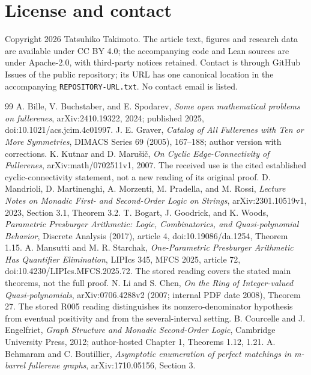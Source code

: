 \documentclass[11pt]{amsart}
\newcommand{\record}[1]{\nolinkurl{#1}}
\theoremstyle{definition}\newtheorem{definition}{Definition}
\begin{document}
\section*{License and contact}
Copyright 2026 Tatsuhiko Takimoto. The article text, figures and research
data are available under CC BY 4.0; the accompanying code and Lean
sources are under Apache-2.0, with third-party notices retained.
Contact is through GitHub Issues of the public repository; its URL
has one canonical location in the accompanying
\record{REPOSITORY-URL.txt}. No contact email is listed.

\clearpage
\begin{thebibliography}{99}
 A. Bille, V. Buchstaber, and E. Spodarev,
\emph{Some open mathematical problems on fullerenes}, arXiv:2410.19322,
2024; published 2025, doi:10.1021/acs.jcim.4c01997.
 J. E. Graver,
\emph{Catalog of All Fullerenes with Ten or More Symmetries},
DIMACS Series 69 (2005), 167--188; author version with corrections.
 K. Kutnar and D. Maru\v{s}i\v{c},
\emph{On Cyclic Edge-Connectivity of Fullerenes}, arXiv:math/0702511v1,
2007. The received use is the cited established cyclic-connectivity
statement, not a new reading of its original proof.
 D. Mandrioli, D. Martinenghi, A. Morzenti,
M. Pradella, and M. Rossi,
\emph{Lecture Notes on Monadic First- and Second-Order Logic on Strings},
arXiv:2301.10519v1, 2023, Section 3.1, Theorem 3.2.
 T. Bogart, J. Goodrick, and K. Woods,
\emph{Parametric Presburger Arithmetic: Logic, Combinatorics, and
Quasi-polynomial Behavior}, Discrete Analysis (2017), article 4,
doi:10.19086/da.1254, Theorem 1.15.
 A. Mansutti and M. R. Starchak,
\emph{One-Parametric Presburger Arithmetic Has Quantifier Elimination},
LIPIcs 345, MFCS 2025, article 72, doi:10.4230/LIPIcs.MFCS.2025.72.
The stored reading covers the stated main theorems, not the full proof.
 N. Li and S. Chen,
\emph{On the Ring of Integer-valued Quasi-polynomials},
arXiv:0706.4288v2 (2007; internal PDF date 2008), Theorem 27.
The stored R005 reading distinguishes its nonzero-denominator hypothesis
from eventual positivity and from the several-interval setting.
 B. Courcelle and J. Engelfriet,
\emph{Graph Structure and Monadic Second-Order Logic}, Cambridge
University Press, 2012; author-hosted Chapter 1, Theorems 1.12, 1.21.
 A. Behmaram and C. Boutillier,
\emph{Asymptotic enumeration of perfect matchings in m-barrel fullerene graphs},
arXiv:1710.05156, Section 3.

\end{thebibliography}
\end{document}
